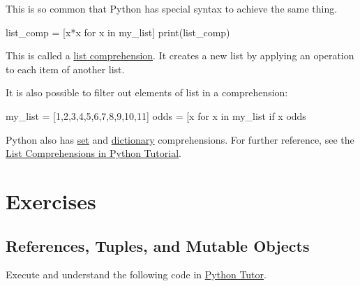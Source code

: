 \documentclass[12pt,letterpaper,twoside]{article}
\begin{document}
This is so common that Python has special syntax to achieve the same
thing.

\begin{python}
list_comp = [x*x for x in my_list]
print(list_comp)
\end{python}

This is called a
\href{https://docs.python.org/3/tutorial/datastructures.html\#list-comprehensions}{list
comprehension}. It creates a new list by applying an operation to each
item of another list.

It is also possible to filter out elements of list in a comprehension:

\begin{python}
my_list = [1,2,3,4,5,6,7,8,9,10,11]
odds = [x for x in my_list if x %
odds
\end{python}

Python also has
\href{http://stackoverflow.com/documentation/python/196/comprehensions/745/set-comprehensions\#t=201609141607227980614}{set}
and
\href{http://stackoverflow.com/documentation/python/196/comprehensions/738/dictionary-comprehensions\#t=201609141607227980614}{dictionary}
comprehensions. For further reference, see the 
\href{https://docs.python.org/3/tutorial/datastructures.html\#list-comprehensions}{List Comprehensions in Python Tutorial}.

\newpage

\section{Exercises}

\subsection{References, Tuples, and Mutable Objects}
Execute and understand the following code in
\href{http://www.pythontutor.com/visualize.html\#code=sub_list_1\%20\%3D\%20\%5B1,3,8\%5D\%0Asub_list_2\%20\%3D\%20\%5B'z','y','x'\%5D\%0Amy_list\%20\%3D\%20\%5B2,\%20'a\%20string',\%20sub_list_1\%5D\%0Amy_list\%5B2\%5D\%20\%3D\%20sub_list_2\%0Amy_list\%5B2\%5D\%5B0\%5D\%20\%3D\%20'new\%20string'\%0A\%0Amy_tup\%20\%3D\%20(2,\%20'a\%20string',\%20sub_list_1\%29\%0A\%0A\%23\%20cannot\%20modify\%20tuple\%20references\%0A\%23\%20my_tup\%5B2\%5D\%20\%3D\%20sub_list_2\%0A\%0A\%23\%20we\%20can\%20modify\%20a\%20mutable\%20object\%20referenced\%20by\%20a\%20tuple\%0Amy_tup\%5B2\%5D\%5B0\%5D\%20\%3D\%20'from\%20my_tup'\%0A\%0A\%23\%20can\%20can\%20look\%20at\%20object\%20ids\%0Aprint(id(sub_list_1\%29\%29\%0Aprint(id(my_tup\%5B2\%5D\%29\%29\&cumulative=false\&curInstr=0\&heapPrimitives=false\&mode=display\&origin=opt-frontend.js\&py=3\&rawInputLstJSON=\%5B\%5D\&textReferences=false}{Python
Tutor}.
\end{document}
